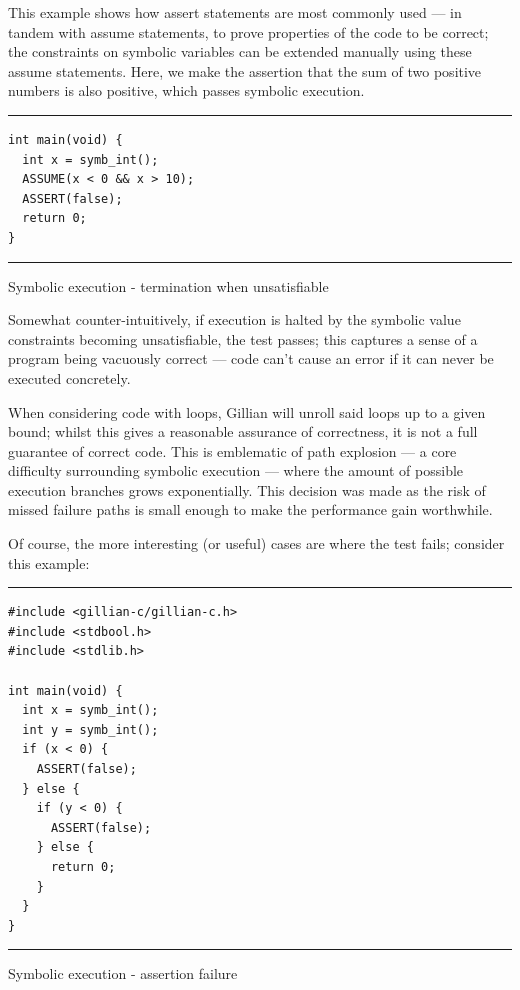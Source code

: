 This example shows how assert statements are most commonly used --- in tandem
with assume statements, to prove properties of the code to be correct; the
constraints on symbolic variables can be extended manually using these assume
statements. Here, we make the assertion that the sum of two positive numbers is
also positive, which passes symbolic execution.

\begin{listing}[!ht]
\noindent\rule{\textwidth}{0.5pt}
\vspace{-0.6cm}
\begin{verbatim}
int main(void) {
  int x = symb_int();
  ASSUME(x < 0 && x > 10);
  ASSERT(false);
  return 0;
}
\end{verbatim}
\vspace{-0.4cm}
\noindent\rule{\textwidth}{0.5pt}
\vspace{-0.6cm}
\caption{Symbolic execution - termination when unsatisfiable}
\end{listing}

Somewhat counter-intuitively, if execution is halted by the symbolic value
constraints becoming unsatisfiable, the test passes; this captures a sense of
a program being vacuously correct --- code can't cause an error if it can never
be executed concretely.

When considering code with loops, Gillian will unroll said loops up to a given
bound; whilst this gives a reasonable assurance of correctness, it is not a full
guarantee of correct code. This is emblematic of path explosion --- a core
difficulty surrounding symbolic execution --- where the amount of possible
execution branches grows exponentially. This decision was made as the risk of
missed failure paths is small enough to make the performance gain worthwhile.

Of course, the more interesting (or useful) cases are where the test fails;
consider this example:

\begin{listing}[!ht]
\noindent\rule{\textwidth}{0.5pt}
\vspace{-0.6cm}
\begin{verbatim}
#include <gillian-c/gillian-c.h>
#include <stdbool.h>
#include <stdlib.h>

int main(void) {
  int x = symb_int();
  int y = symb_int();
  if (x < 0) {
    ASSERT(false);
  } else {
    if (y < 0) {
      ASSERT(false);
    } else {
      return 0;
    }
  }
}
\end{verbatim}
\vspace{-0.4cm}
\noindent\rule{\textwidth}{0.5pt}
\vspace{-0.6cm}
\caption{Symbolic execution - assertion failure}
\end{listing}

